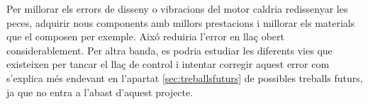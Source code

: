 \begin{itemize}
	Per millorar els errors de disseny o vibracions del motor caldria redissenyar les peces, adquirir nous components amb millors prestacions i millorar els materials que el composen per exemple. Aixó reduiria l'error en llaç obert considerablement. Per altra banda, es podria estudiar les diferents vies que existeixen per tancar el llaç de control i intentar corregir aquest error com s'explica més endevant en l'apartat \ref{sec:treballsfuturs} de possibles treballs futurs, ja que no entra a l'abast d'aquest projecte. 
	
	
	
\end{itemize}



